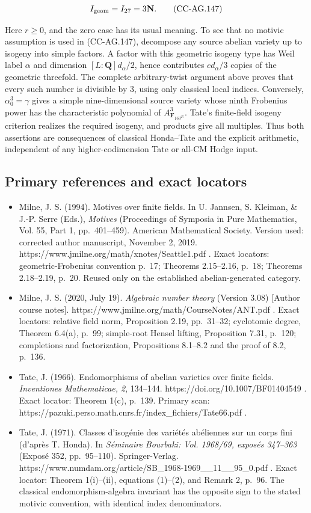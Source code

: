 \[
 I_{\rm geom}=I_{27}=3\mathbf N.
 \tag{CC-AG.147}
\]

Here \(r\ge0\), and the zero case has its usual meaning. To see that no
motivic assumption is used in (CC-AG.147), decompose any source abelian
variety up to isogeny into simple factors. A factor with this geometric
isogeny type has Weil label \(\alpha\) and dimension
\([L:\mathbf Q]d_\alpha/2\), hence contributes \(c d_\alpha/3\) copies
of the geometric threefold. The complete arbitrary-twist argument above
proves that every such number is divisible by \(3\), using only
classical local indices. Conversely, \(\alpha_0^3=\gamma\) gives a
simple nine-dimensional source variety whose ninth Frobenius power has
the characteristic polynomial of \(A_{\mathbf F_{163^{27}}}^{3}\).
Tate's finite-field isogeny criterion realizes the required isogeny, and
products give all multiples. Thus both assertions are consequences of
classical Honda--Tate and the explicit arithmetic, independent of any
higher-codimension Tate or all-CM Hodge input.

\subsection{Primary references and exact
locators}\label{primary-references-and-exact-locators}

\begin{itemize}
\tightlist
\item
  Milne, J. S. (1994). Motives over finite fields. In U. Jannsen, S.
  Kleiman, \& J.-P. Serre (Eds.), \emph{Motives} (Proceedings of
  Symposia in Pure Mathematics, Vol. 55, Part 1, pp.~401--459). American
  Mathematical Society. Version used: corrected author manuscript,
  November 2, 2019. https://www.jmilne.org/math/xnotes/Seattle1.pdf .
  Exact locators: geometric-Frobenius convention p.~17; Theorems
  2.15--2.16, p.~18; Theorems 2.18--2.19, p.~20. Reused only on the
  established abelian-generated category.
\item
  Milne, J. S. (2020, July 19). \emph{Algebraic number theory} (Version
  3.08) {[}Author course notes{]}.
  https://www.jmilne.org/math/CourseNotes/ANT.pdf . Exact locators:
  relative field norm, Proposition 2.19, pp.~31--32; cyclotomic degree,
  Theorem 6.4(a), p.~99; simple-root Hensel lifting, Proposition 7.31,
  p.~120; completions and factorization, Propositions 8.1--8.2 and the
  proof of 8.2, p.~136.
\item
  Tate, J. (1966). Endomorphisms of abelian varieties over finite
  fields. \emph{Inventiones Mathematicae, 2}, 134--144.
  https://doi.org/10.1007/BF01404549 . Exact locator: Theorem 1(c),
  p.~139. Primary scan:
  https://pazuki.perso.math.cnrs.fr/index\_fichiers/Tate66.pdf .
\item
  Tate, J. (1971). Classes d'isogénie des variétés abéliennes sur un
  corps fini (d'après T. Honda). In \emph{Séminaire Bourbaki: Vol.
  1968/69, exposés 347--363} (Exposé 352, pp.~95--110). Springer-Verlag.
  https://www.numdam.org/article/SB\_1968-1969\_\_11\_\_95\_0.pdf .
  Exact locator: Theorem 1(i)--(ii), equations (1)--(2), and Remark 2,
  p.~96. The classical endomorphism-algebra invariant has the opposite
  sign to the stated motivic convention, with identical index
  denominators.
\end{itemize}
